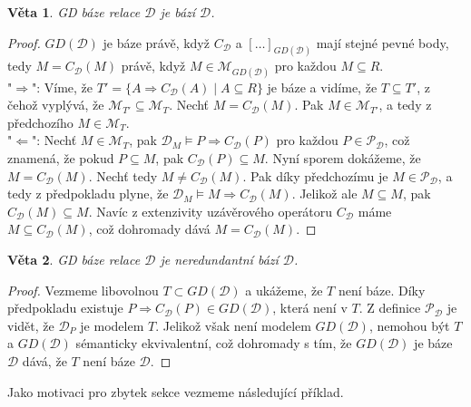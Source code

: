 \documentclass{article}
\newtheorem{theorem}{Věta}
\theoremstyle {definition}
\begin{document}
\begin{theorem}
  GD báze relace $\mathcal D$ je bází $\mathcal D$.
\end{theorem}
\begin{proof}
  $GD(\mathcal D)$ je báze právě, když $C_{\mathcal{D}}$ a
  $[\dots]_{GD(\mathcal D)}$ mají stejné pevné body, tedy $M =
  C_{\mathcal{D}}(M)$ právě, když $M \in \mathcal{M}_{GD(\mathcal D)}$
  pro každou $M\subseteq R$.\\
  
  "$\Rightarrow$": Víme, že $T' = \{A \Rightarrow C_{\mathcal{D}}(A)
  \mid A \subseteq R\}$ je báze a vidíme, že $T \subseteq T'$, z čehož
  vyplývá, že $\mathcal{M}_{T'} \subseteq \mathcal{M}_T$. Nechť $M =
  C_{\mathcal{D}}(M)$. Pak $M \in \mathcal{M}_{T'}$, a tedy z
  předchozího $M \in \mathcal{M}_T$.\\
  
  "$\Leftarrow$": Nechť $M \in \mathcal{M}_T$, pak $\mathcal{D}_M
  \models P \Rightarrow C_{\mathcal{D}}(P)$ pro každou $P \in
  \mathcal P_{\mathcal{D}}$, což znamená, že pokud $P \subseteq M$, pak
  $C_{\mathcal{D}}(P) \subseteq M$. Nyní sporem dokážeme, že $M =
  C_{\mathcal{D}}(M)$. Nechť tedy $M \neq C_{\mathcal{D}}(M)$. Pak
  díky předchozímu je $M \in \mathcal P_{\mathcal{D}}$, a tedy z předpokladu
  plyne, že $\mathcal{D}_M \models M \Rightarrow
  C_{\mathcal{D}}(M)$. Jelikož ale $M \subseteq M$, pak
  $C_{\mathcal{D}}(M) \subseteq M$. Navíc z extenzivity uzávěrového
  operátoru $C_{\mathcal{D}}$ máme $M \subseteq C_{\mathcal{D}}(M)$,
  což dohromady dává $M = C_{\mathcal{D}}(M)$.
\end{proof}

\begin {theorem}
  GD báze relace $\mathcal D$ je neredundantní bází $\mathcal D$.
\end {theorem}
\begin {proof}
  Vezmeme libovolnou $T\subset GD(\mathcal D)$ a ukážeme, že $T$ není
  báze. Díky předpokladu existuje $P \Rightarrow C_{\mathcal{D}}(P)\in
  GD(\mathcal D)$, která není v $T$. Z definice $\mathcal
  P_{\mathcal{D}}$ je vidět, že $\mathcal{D}_P$ je modelem
  $T$. Jelikož však není modelem $GD(\mathcal D)$, nemohou být $T$ a
  $GD(\mathcal D)$ sémanticky ekvivalentní, což dohromady s tím, že
  $GD(\mathcal D)$ je báze $\mathcal D$ dává, že $T$ není báze
  $\mathcal D$.
\end {proof}

Jako motivaci pro zbytek sekce vezmeme následující příklad.
\end{document}
